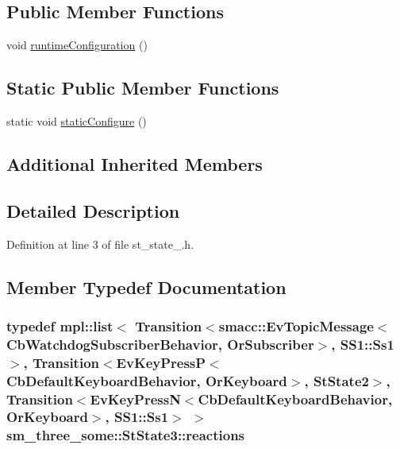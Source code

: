 \subsection*{Public Member Functions}
\begin{DoxyCompactItemize}
\item 
void \hyperlink{structsm__three__some_1_1StState3_a8d6d551aefa28e9ae7095b1b25bd020a}{runtime\+Configuration} ()
\end{DoxyCompactItemize}
\subsection*{Static Public Member Functions}
\begin{DoxyCompactItemize}
\item 
static void \hyperlink{structsm__three__some_1_1StState3_ada7e90f8207dd295b4db425e0c13f4ab}{static\+Configure} ()
\end{DoxyCompactItemize}
\subsection*{Additional Inherited Members}


\subsection{Detailed Description}


Definition at line 3 of file st\+\_\+state\+\_.\+h.



\subsection{Member Typedef Documentation}
\subsubsection[{\texorpdfstring{reactions}{reactions}}]{\setlength{\rightskip}{0pt plus 5cm}typedef mpl\+::list$<$ Transition$<${\bf smacc\+::\+Ev\+Topic\+Message}$<${\bf Cb\+Watchdog\+Subscriber\+Behavior}, {\bf Or\+Subscriber}$>$, {\bf S\+S1\+::\+Ss1}$>$, Transition$<$Ev\+Key\+PressP$<$Cb\+Default\+Keyboard\+Behavior, {\bf Or\+Keyboard}$>$, {\bf St\+State2}$>$, Transition$<$Ev\+Key\+PressN$<$Cb\+Default\+Keyboard\+Behavior, {\bf Or\+Keyboard}$>$, {\bf S\+S1\+::\+Ss1}$>$ $>$ {\bf sm\+\_\+three\+\_\+some\+::\+St\+State3\+::reactions}}\hypertarget{structsm__three__some_1_1StState3_a94ec512640370313e7731ce02aa6dd80}{}\label{structsm__three__some_1_1StState3_a94ec512640370313e7731ce02aa6dd80}


